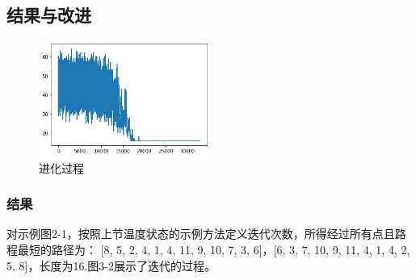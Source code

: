 \documentclass[12pt]{article}
\begin{document}
\subsection{结果与改进}
\begin{figure}[h]
    \centering
    \includegraphics[width = 0.5\textwidth]{assets/evolution.jpg}
    \caption{\label{fig evolution.jpg}进化过程}
\end{figure}
\subsubsection{结果}
对示例图2-1，按照上节温度状态的示例方法定义迭代次数，所得经过所有点且路程最短的路径为： [8, 5, 2, 4, 1, 4, 11, 9, 10, 7, 3, 6]，[6, 3, 7, 10, 9, 11, 4, 1, 4, 2, 5, 8]，长度为16.图3-2展示了迭代的过程。
\end{document}
